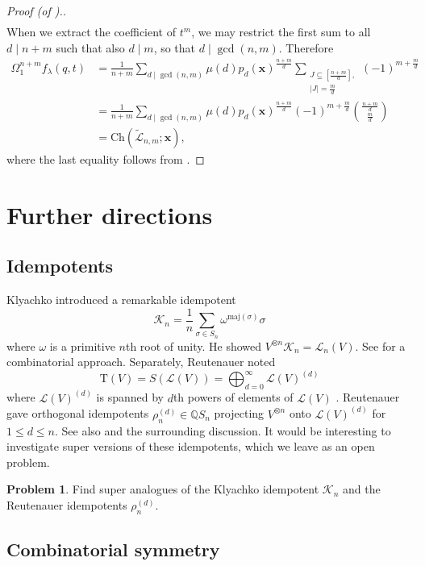 \documentclass[11pt]{article}
\theoremstyle{definition}
\newtheorem{prob}[theo]{Problem}
\numberwithin{equation}{section}
\newcommand\QQ{\mathbb{Q}}
\newcommand\ch{\Ch}
\newcommand\maj{\mathrm{maj}}
\newcommand\Trm{\mathrm{T}}
\newcommand\xb{\mathbf{x}}
\newcommand\Lcal{\mathcal{L}}
\newcommand\Ltil{\widetilde{\mathcal{L}}}
\newcommand\Ch{\mathrm{Ch}}
\begin{document}
\begin{proof}[Proof (of ).]
\begin{align*}
    \end{align*}
    When we extract the coefficient of $t^m$, we may restrict the first sum to all $d \mid n+m$ such that also $d \mid m$, so that $d \mid \gcd(n,m)$. Therefore
    \begin{align*}
    [t^m]\Omega_1^{n+m}f_\lambda(q,t) &= \frac{1}{n+m} \sum_{d \mid \gcd(n,m)} \mu(d) p_d(\xb)^\frac{n+m}{d} \sum_{\substack{J \subseteq [\frac{n+m}{d}], \\ |J| = \frac{m}{d}}} (-1)^{m + \frac{m}{d}} \\
    &= \frac{1}{n+m} \sum_{d \mid \gcd(n,m)} \mu(d) p_d(\xb)^\frac{n+m}{d} (-1)^{m + \frac{m}{d}} \binom{\frac{n+m}{d}}{\frac{m}{d}} \\
    &= \ch(\Ltil_{n,m};\xb),
    \end{align*}
    where the last equality follows from .
\end{proof}

\section{Further directions}\label{sec:addl}

\subsection{Idempotents}

Klyachko \cite{Kly} introduced a remarkable idempotent
  \[ \mathcal{K}_n = \frac{1}{n} \sum_{\sigma \in S_n} \omega^{\maj(\sigma)} \sigma \]
where $\omega$ is a primitive $n$th root of unity. He showed $V^{\otimes n} \mathcal{K}_n = \Lcal_n(V)$. See \cite[\S4]{Gar} for a combinatorial approach. Separately, Reutenauer noted
  \[ \Trm(V) = S(\Lcal(V)) = \bigoplus_{d=0}^\infty \Lcal(V)^{(d)} \]
where $\Lcal(V)^{(d)}$ is spanned by $d$th powers of elements of $\Lcal(V)$ \cite[\S2]{Reu-idemp}. Reutenauer gave orthogonal idempotents $\rho_n^{(d)} \in \QQ S_n$ projecting $V^{\otimes n}$ onto $\Lcal(V)^{(d)}$ for $1 \leq d \leq n$. See also \cite[Thm.~7.3]{Gar} and the surrounding discussion. It would be interesting to investigate super versions of these idempotents, which we leave as an open problem.

\begin{prob}
    Find super analogues of the Klyachko idempotent $\mathcal{K}_n$ and the Reutenauer idempotents $\rho_n^{(d)}$.
\end{prob}

\subsection{Combinatorial symmetry}
\end{document}
